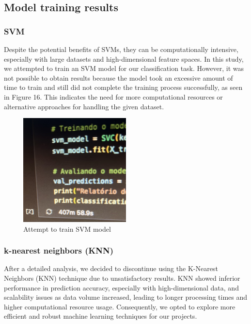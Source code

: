 \documentclass[conference]{IEEEtran}
\begin{document}
\subsection{Model training results}

\subsubsection{SVM}

Despite the potential benefits of SVMs, they can be computationally intensive, especially with large datasets and high-dimensional feature spaces. In this study, we attempted to train an SVM model for our classification task. However, it was not possible to obtain results because the model took an excessive amount of time to train and still did not complete the training process successfully, as seen in Figure 16. This indicates the need for more computational resources or alternative approaches for handling the given dataset.

\begin{figure}[ht]
\centering
    \includegraphics[width=0.5\textwidth]{images/SVMTrain.jpeg}
    \caption{Attempt to train SVM model}
\end{figure}

\subsubsection{k-nearest neighbors (KNN)}

After a detailed analysis, we decided to discontinue using the K-Nearest Neighbors (KNN) technique due to unsatisfactory results. KNN showed inferior performance in prediction accuracy, especially with high-dimensional data, and scalability issues as data volume increased, leading to longer processing times and higher computational resource usage. Consequently, we opted to explore more efficient and robust machine learning techniques for our projects.
\end{document}
